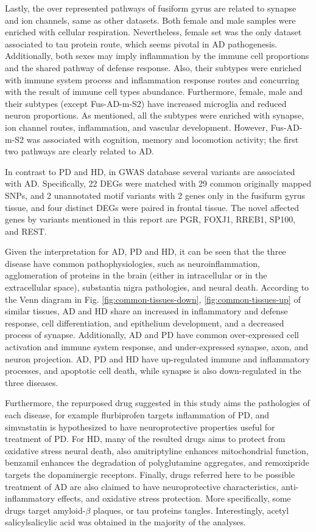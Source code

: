Lastly, the over represented pathways of fusiform gyrus are related to synapse and ion channels, same as other datasets. Both female and male samples were enriched with cellular respiration. Nevertheless, female set was the only dataset associated to tau protein route, which seems pivotal in AD pathogenesis. Additionally, both sexes may imply inflammation by the immune cell proportions and the shared pathway of defense response. Also, their subtypes were enriched with immune system process and inflammation response routes and concurring with the result of immune cell types abundance. Furthermore, female, male and their subtypes (except Fus-AD-m-S2) have increased microglia and reduced neuron proportions. As mentioned, all the subtypes were enriched with synapse, ion channel routes, inflammation, and vascular development. However, Fus-AD-m-S2 was associated with cognition, memory and locomotion activity; the first two pathways are clearly related to AD. 

In contrast to PD and HD, in GWAS database several variants are associated with AD. Specifically, 22 DEGs were matched with 29 common originally mapped SNPs, and 2 unannotated motif variants with 2 genes only in the fusifurm gyrus tissue, and four distinct DEGs were paired in frontal tissue. The novel affected genes by variants mentioned in this report are PGR, FOXJ1, RREB1, SP100, and REST.

Given the interpretation for AD, PD and HD, it can be seen that the three disease have common pathophysiologies, such as neuroinflammation, agglomeration of proteins in the brain (either in intracellular or in the extracellular space), substantia nigra pathologies, and neural death. According to the Venn diagram in Fig. \ref{fig:common-tissues-down}, \ref{fig:common-tissues-up} of similar tissues, AD and HD share an increased in inflammatory and defense response, cell differentiation, and epithelium development, and a decreased process of synapse. Additionally, AD and PD have common over-expressed cell activation and immune system response, and under-expressed synapse, axon, and neuron projection. AD, PD and HD have up-regulated immune and inflammatory processes, and apoptotic cell death, while synapse is also down-regulated in the three diseases.

Furthermore, the repurposed drug suggested in this study aims the pathologies of each disease, for example flurbiprofen targets inflammation of PD, and simvastatin is hypothesized to have neuroprotective properties useful for treatment of PD. For HD, many of the resulted drugs aims to protect from oxidative stress neural death, also amitriptyline enhances mitochondrial function, benzamil enhances the degradation of polyglutamine aggregates, and remoxipride targets the dopaminergic receptors. Finally, drugs referred here to be possible treatment of AD are also claimed to have neuroprotective characteristics, anti-inflammatory effects, and oxidative stress protection. More specifically, some drugs target amyloid-$\beta$ plaques, or tau proteins tangles. Interestingly, acetyl salicylsalicylic acid was obtained in the majority of the analyses. 


